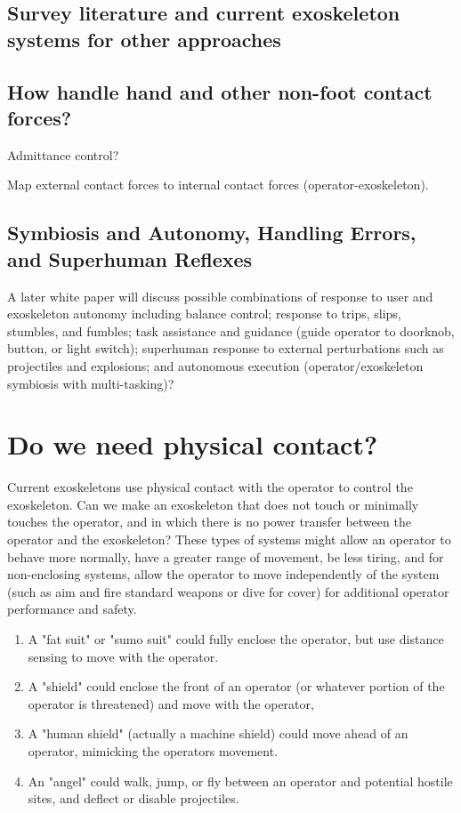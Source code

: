 \documentclass[letterpaper,12pt,fullpage]{article}
\begin{document}
\subsection{Survey literature and current exoskeleton systems for other approaches}

\subsection{How handle hand and other non-foot contact forces?}

Admittance control?

Map external contact forces to internal contact forces (operator-exoskeleton).

\subsection{Symbiosis and Autonomy, Handling Errors, and Superhuman Reflexes}

A later white paper will discuss
possible combinations of response to user and exoskeleton
autonomy including balance control; response to trips, slips,
stumbles, and fumbles; task assistance and guidance (guide operator to
doorknob, button, or light switch); superhuman response to external
perturbations such as projectiles and explosions; and autonomous
execution (operator/exoskeleton symbiosis with multi-tasking)?

\section{Do we need physical contact?}

Current exoskeletons use physical contact with the operator to control
the exoskeleton. Can we make an exoskeleton that does not touch or
minimally touches the operator, and in which there is no power
transfer between the operator and the exoskeleton? These types of
systems might allow an operator to behave more normally, have a
greater range of movement, be less tiring, and for non-enclosing
systems, allow the operator to move independently of the system (such
as aim and fire standard weapons or dive for cover) for additional
operator performance and safety.
\begin{enumerate}
\item
A "fat suit" or "sumo suit" could fully enclose the operator, but
use distance sensing to move with the operator.
\item
A "shield" could enclose the front of an operator (or whatever
portion of the operator is threatened) and move with the operator,
\item
A "human shield" (actually a machine shield) could move ahead of
an operator, mimicking the operators movement.
\item
An "angel" could walk, jump, or fly between an operator and potential
hostile sites, and deflect or disable projectiles.
\end{enumerate}
\end{document}
